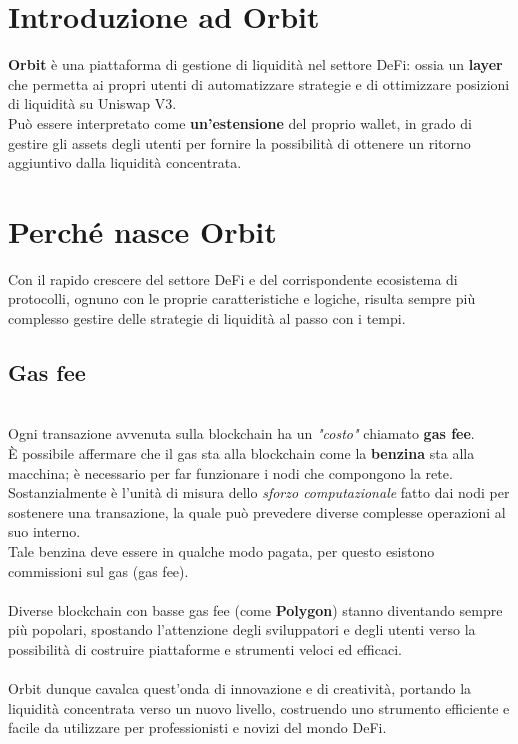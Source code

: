 \documentclass[12pt,a4paper]{report}
\begin{document}
\section{Introduzione ad Orbit}


\textbf{Orbit} è una piattaforma di gestione di liquidità nel settore DeFi: ossia un \textbf{layer} che permetta ai propri utenti di automatizzare strategie e di ottimizzare posizioni di liquidità su Uniswap V3.
\\Può essere interpretato come \textbf{un'estensione} del proprio wallet, in grado di gestire gli assets degli utenti per fornire la possibilità di ottenere un ritorno aggiuntivo dalla liquidità concentrata.

\section{Perché nasce Orbit}

Con il rapido crescere del settore DeFi e del corrispondente ecosistema di protocolli, ognuno con le proprie caratteristiche e logiche, risulta sempre più complesso gestire delle strategie di liquidità al passo con i tempi.

\subsection{Gas fee}
\\Ogni transazione avvenuta sulla blockchain ha un \textit{"costo"} chiamato \textbf{gas fee}\cite{gas}.
\\È possibile affermare che il gas sta alla blockchain come la \textbf{benzina} sta alla macchina; è necessario per far funzionare i nodi che compongono la rete.
\\Sostanzialmente è l'unità di misura dello \textit{sforzo computazionale} fatto dai nodi per sostenere una transazione, la quale può prevedere diverse complesse operazioni al suo interno.
\\Tale benzina deve essere in qualche modo pagata, per questo esistono commissioni sul gas (gas fee).
\\\\Diverse blockchain con basse gas fee (come \textbf{Polygon}\cite{polygon}) stanno diventando sempre più popolari, spostando l'attenzione degli sviluppatori e degli utenti verso la possibilità di costruire piattaforme e strumenti veloci ed efficaci.
\\\\Orbit dunque cavalca quest'onda di innovazione e di creatività, portando la liquidità concentrata verso un nuovo livello, costruendo uno strumento efficiente e facile da utilizzare per professionisti e novizi del mondo DeFi.\\\\
\end{document}
